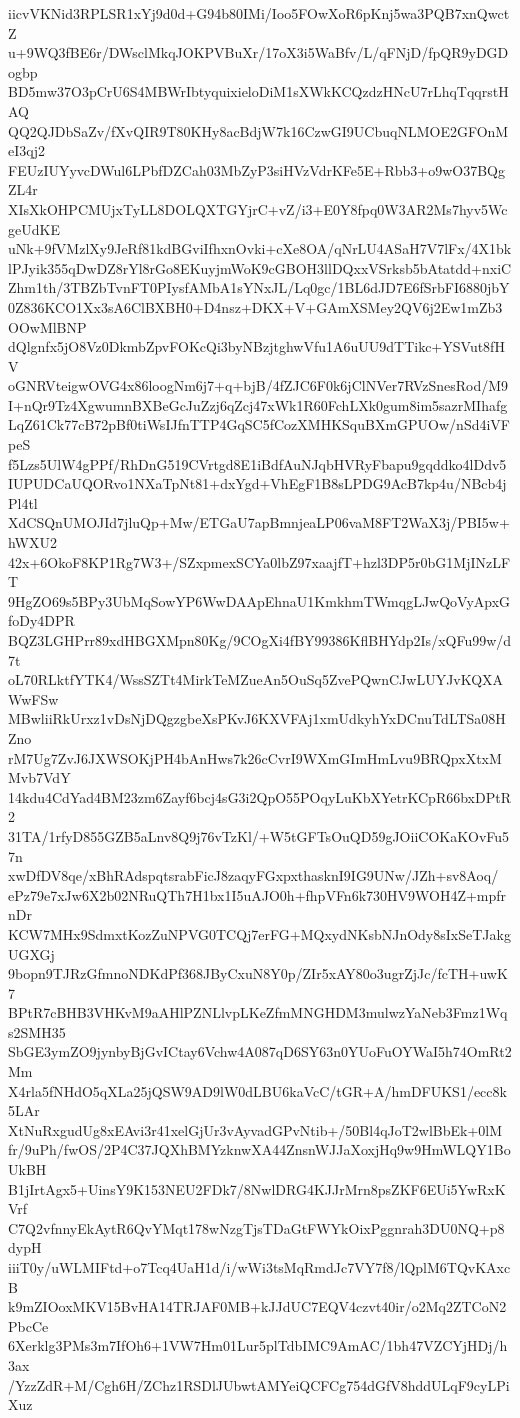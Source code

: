 iicvVKNid3RPLSR1xYj9d0d+G94b80IMi/Ioo5FOwXoR6pKnj5wa3PQB7xnQwctZ
u+9WQ3fBE6r/DWsclMkqJOKPVBuXr/17oX3i5WaBfv/L/qFNjD/fpQR9yDGDogbp
BD5mw37O3pCrU6S4MBWrIbtyquixieloDiM1sXWkKCQzdzHNcU7rLhqTqqrstHAQ
QQ2QJDbSaZv/fXvQIR9T80KHy8acBdjW7k16CzwGI9UCbuqNLMOE2GFOnMeI3qj2
FEUzIUYyvcDWul6LPbfDZCah03MbZyP3siHVzVdrKFe5E+Rbb3+o9wO37BQgZL4r
XIsXkOHPCMUjxTyLL8DOLQXTGYjrC+vZ/i3+E0Y8fpq0W3AR2Ms7hyv5WcgeUdKE
uNk+9fVMzlXy9JeRf81kdBGviIfhxnOvki+cXe8OA/qNrLU4ASaH7V7lFx/4X1bk
lPJyik355qDwDZ8rYl8rGo8EKuyjmWoK9cGBOH3llDQxxVSrksb5bAtatdd+nxiC
Zhm1th/3TBZbTvnFT0PIysfAMbA1sYNxJL/Lq0gc/1BL6dJD7E6fSrbFI6880jbY
0Z836KCO1Xx3sA6ClBXBH0+D4nsz+DKX+V+GAmXSMey2QV6j2Ew1mZb3OOwMlBNP
dQlgnfx5jO8Vz0DkmbZpvFOKcQi3byNBzjtghwVfu1A6uUU9dTTikc+YSVut8fHV
oGNRVteigwOVG4x86loogNm6j7+q+bjB/4fZJC6F0k6jClNVer7RVzSnesRod/M9
I+nQr9Tz4XgwumnBXBeGcJuZzj6qZcj47xWk1R60FchLXk0gum8im5sazrMIhafg
LqZ61Ck77cB72pBf0tiWsIJfnTTP4GqSC5fCozXMHKSquBXmGPUOw/nSd4iVFpeS
f5Lzs5UlW4gPPf/RhDnG519CVrtgd8E1iBdfAuNJqbHVRyFbapu9gqddko4lDdv5
IUPUDCaUQORvo1NXaTpNt81+dxYgd+VhEgF1B8sLPDG9AcB7kp4u/NBcb4jPl4tl
XdCSQnUMOJId7jluQp+Mw/ETGaU7apBmnjeaLP06vaM8FT2WaX3j/PBI5w+hWXU2
42x+6OkoF8KP1Rg7W3+/SZxpmexSCYa0lbZ97xaajfT+hzl3DP5r0bG1MjINzLFT
9HgZO69s5BPy3UbMqSowYP6WwDAApEhnaU1KmkhmTWmqgLJwQoVyApxGfoDy4DPR
BQZ3LGHPrr89xdHBGXMpn80Kg/9COgXi4fBY99386KflBHYdp2Is/xQFu99w/d7t
oL70RLktfYTK4/WssSZTt4MirkTeMZueAn5OuSq5ZvePQwnCJwLUYJvKQXAWwFSw
MBwliiRkUrxz1vDsNjDQgzgbeXsPKvJ6KXVFAj1xmUdkyhYxDCnuTdLTSa08HZno
rM7Ug7ZvJ6JXWSOKjPH4bAnHws7k26cCvrI9WXmGImHmLvu9BRQpxXtxMMvb7VdY
14kdu4CdYad4BM23zm6Zayf6bcj4sG3i2QpO55POqyLuKbXYetrKCpR66bxDPtR2
31TA/1rfyD855GZB5aLnv8Q9j76vTzKl/+W5tGFTsOuQD59gJOiiCOKaKOvFu57n
xwDfDV8qe/xBhRAdspqtsrabFicJ8zaqyFGxpxthasknI9IG9UNw/JZh+sv8Aoq/
ePz79e7xJw6X2b02NRuQTh7H1bx1I5uAJO0h+fhpVFn6k730HV9WOH4Z+mpfrnDr
KCW7MHx9SdmxtKozZuNPVG0TCQj7erFG+MQxydNKsbNJnOdy8sIxSeTJakgUGXGj
9bopn9TJRzGfmnoNDKdPf368JByCxuN8Y0p/ZIr5xAY80o3ugrZjJc/fcTH+uwK7
BPtR7cBHB3VHKvM9aAHlPZNLlvpLKeZfmMNGHDM3mulwzYaNeb3Fmz1Wqs2SMH35
SbGE3ymZO9jynbyBjGvICtay6Vchw4A087qD6SY63n0YUoFuOYWaI5h74OmRt2Mm
X4rla5fNHdO5qXLa25jQSW9AD9lW0dLBU6kaVcC/tGR+A/hmDFUKS1/ecc8k5LAr
XtNuRxgudUg8xEAvi3r41xelGjUr3vAyvadGPvNtib+/50Bl4qJoT2wlBbEk+0lM
fr/9uPh/fwOS/2P4C37JQXhBMYzknwXA44ZnsnWJJaXoxjHq9w9HmWLQY1BoUkBH
B1jIrtAgx5+UinsY9K153NEU2FDk7/8NwlDRG4KJJrMrn8psZKF6EUi5YwRxKVrf
C7Q2vfnnyEkAytR6QvYMqt178wNzgTjsTDaGtFWYkOixPggnrah3DU0NQ+p8dypH
iiiT0y/uWLMIFtd+o7Tcq4UaH1d/i/wWi3tsMqRmdJc7VY7f8/lQplM6TQvKAxcB
k9mZIOoxMKV15BvHA14TRJAF0MB+kJJdUC7EQV4czvt40ir/o2Mq2ZTCoN2PbcCe
6Xerklg3PMs3m7IfOh6+1VW7Hm01Lur5plTdbIMC9AmAC/1bh47VZCYjHDj/h3ax
/YzzZdR+M/Cgh6H/ZChz1RSDlJUbwtAMYeiQCFCg754dGfV8hddULqF9cyLPiXuz
